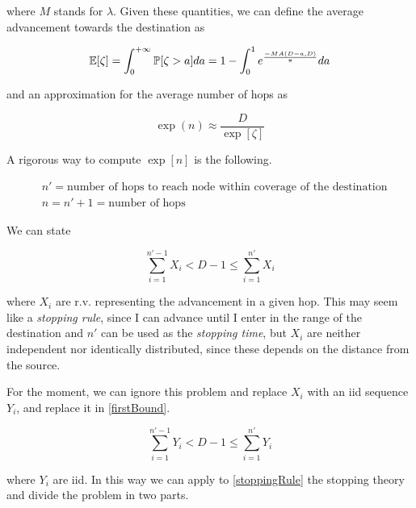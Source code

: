 	where $M$ stands for $\lambda$. Given these quantities, we can define the average advancement towards the destination as

	\begin{equation}
		\mathbb{E}[\zeta] = \int_0^{+\infty} \mathbb{P}[\zeta > a]da = 1-\int_0^1 e^{\frac{-MA(D-a,D)}{\pi}}da
	\end{equation}

	and an approximation for the average number of hops as

	\begin{equation}
		\exp(n) \approx \frac{D}{\exp[\zeta]}
	\end{equation}

A rigorous way to compute $\exp[n]$ is the following.

\begin{equation}\label{hopsdefinition}
	\begin{split}
		&n' = \text{number of hops to reach node within coverage of the destination}\\
		&n = n' + 1 = \text{number of hops}
	\end{split}
\end{equation}

We can state

\begin{equation}\label{firstBound}
	\sum_{i=1}^{n'-1} X_i < D-1 \le \sum_{i=1}^{n'} X_i
\end{equation}

where $X_i$ are r.v. representing the advancement in a given hop.
This may seem like a \textit{stopping rule}, since I can advance until I enter in the range of the destination and $n'$ can be used as the \textit{stopping time}, but $X_i$ are neither independent nor identically distributed, since these depends on the distance from the source.

For the moment, we can ignore this problem and replace $X_i$ with an iid sequence $Y_i$, and replace it in \eqref{firstBound}.

\begin{equation}\label{stoppingRule}
	\sum_{i=1}^{n'-1} Y_i < D-1 \le \sum_{i=1}^{n'} Y_i
\end{equation}

where $Y_i$ are iid.
In this way we can apply to \eqref{stoppingRule} the stopping theory and divide the problem in two parts.

